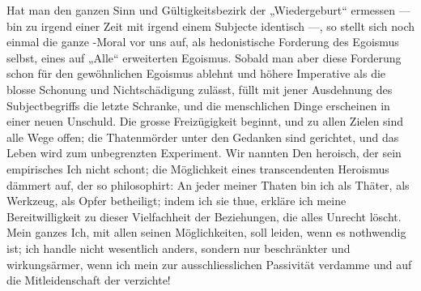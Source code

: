 Hat man den ganzen Sinn und Gültigkeitsbezirk der „Wiedergeburt“ ermessen — bin zu irgend einer Zeit mit irgend einem Subjecte identisch —, so stellt sich noch einmal die ganze -Moral vor uns auf, als hedonistische Forderung des Egoismus selbst, eines auf „Alle“ erweiterten Egoismus. Sobald man aber diese Forderung schon für den gewöhnlichen Egoismus ablehnt und höhere Imperative als die blosse Schonung und Nichtschädigung zulässt, füllt mit jener Ausdehnung des Subjectbegriffs die letzte Schranke, und die menschlichen Dinge erscheinen in einer neuen Unschuld. Die grosse Freizügigkeit beginnt, und zu allen Zielen sind alle Wege offen; die Thatenmörder unter den Gedanken sind gerichtet, und das Leben wird zum unbegrenzten Experiment. Wir nannten Den heroisch, der sein empirisches Ich nicht schont; die Möglichkeit eines transcendenten Heroismus dämmert auf, der so philosophirt: An jeder meiner Thaten bin ich als Thäter, als Werkzeug, als Opfer betheiligt; indem ich sie thue, erkläre ich meine Bereitwilligkeit zu dieser Vielfachheit der Beziehungen, die alles Unrecht löscht. Mein ganzes Ich, mit allen seinen Möglichkeiten, soll leiden, wenn es nothwendig ist; ich handle nicht wesentlich anders, sondern nur beschränkter und wirkungsärmer, wenn ich mein  zur ausschliesslichen Passivität verdamme und auf die Mitleidenschaft der  verzichte!
\par

